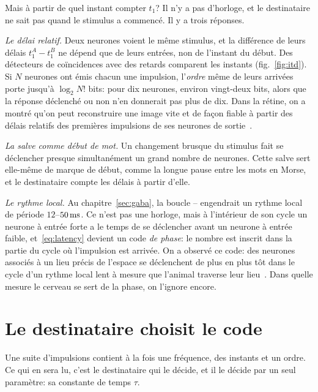 Mais à partir de quel instant compter $t_1$? Il n'y a pas d'horloge, et le destinataire ne sait pas quand le stimulus a commencé. Il y a trois réponses.

\emph{Le délai relatif.} Deux neurones voient le même stimulus, et la différence de leurs délais $t_1^A-t_1^B$ ne dépend que de leurs entrées, non de l'instant du début. Des détecteurs de coïncidences avec des retards comparent les instants (fig.~\ref{fig:itd}). Si $N$ neurones ont émis chacun une impulsion, l'\emph{ordre} même de leurs arrivées porte jusqu'à $\log_2N!$ bits: pour dix neurones, environ vingt-deux bits, alors que la réponse \og déclenché ou non\fg{} n'en donnerait pas plus de dix. Dans la rétine, on a montré qu'on peut reconstruire une image vite et de façon fiable à partir des délais relatifs des premières impulsions de ses neurones de sortie~\cite{Gollisch2008}.

\emph{La salve comme début de mot.} Un changement brusque du stimulus fait se déclencher presque simultanément un grand nombre de neurones. Cette salve sert elle-même de marque de début, comme la longue pause entre les mots en Morse, et le destinataire compte les délais à partir d'elle.

\emph{Le rythme local.} Au chapitre~\ref{sec:gaba}, la boucle -- engendrait un rythme local de période $12$--$50\,\text{ms}$. Ce n'est pas une horloge, mais à l'intérieur de son cycle un neurone à entrée forte a le temps de se déclencher avant un neurone à entrée faible, et~\eqref{eq:latency} devient un code \emph{de phase}: le nombre est inscrit dans la partie du cycle où l'impulsion est arrivée. On a observé ce code: des neurones associés à un lieu précis de l'espace se déclenchent de plus en plus tôt dans le cycle d'un rythme local lent à mesure que l'animal traverse \og leur\fg{} lieu~\cite{OKeefe1993}. Dans quelle mesure le cerveau se sert de la phase, on l'ignore encore.

\section{Le destinataire choisit le code}

Une suite d'impulsions contient à la fois une fréquence, des instants et un ordre. Ce qui en sera lu, c'est le destinataire qui le décide, et il le décide par un seul paramètre: sa constante de temps $\tau$.

